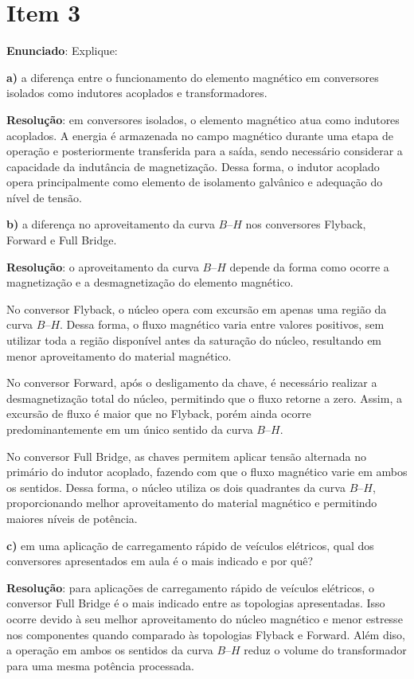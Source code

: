 \section*{Item 3}\label{it:3}

\textbf{Enunciado}: Explique:

\medskip
\textbf{a)} a diferença entre o funcionamento do elemento magnético em conversores isolados como indutores acoplados e transformadores.

\medskip
\textbf{Resolução}: em conversores isolados, o elemento magnético atua como indutores acoplados. A energia é armazenada no campo magnético durante uma etapa de operação e posteriormente transferida para a saída, sendo necessário considerar a capacidade da indutância de magnetização. Dessa forma, o indutor acoplado opera principalmente como elemento de isolamento galvânico e adequação do nível de tensão.

\medskip
\textbf{b)} a diferença no aproveitamento da curva $B$--$H$ nos conversores Flyback, Forward e Full Bridge.

\medskip
\textbf{Resolução}: o aproveitamento da curva $B$--$H$ depende da forma como ocorre a magnetização e a desmagnetização do elemento magnético.

No conversor Flyback, o núcleo opera com excursão em apenas uma região da curva $B$--$H$. Dessa forma, o fluxo magnético varia entre valores positivos, sem utilizar toda a região disponível antes da saturação do núcleo, resultando em menor aproveitamento do material magnético.

No conversor Forward, após o desligamento da chave, é necessário realizar a desmagnetização total do núcleo, permitindo que o fluxo retorne a zero. Assim, a excursão de fluxo é maior que no Flyback, porém ainda ocorre predominantemente em um único sentido da curva $B$--$H$.

No conversor Full Bridge, as chaves permitem aplicar tensão alternada no primário do indutor acoplado, fazendo com que o fluxo magnético varie em ambos os sentidos. Dessa forma, o núcleo utiliza os dois quadrantes da curva $B$--$H$, proporcionando melhor aproveitamento do material magnético e permitindo maiores níveis de potência.

\medskip
\textbf{c)} em uma aplicação de carregamento rápido de veículos elétricos, qual dos conversores apresentados em aula é o mais indicado e por quê?

\medskip
\textbf{Resolução}: para aplicações de carregamento rápido de veículos elétricos, o conversor Full Bridge é o mais indicado entre as topologias apresentadas. Isso ocorre devido à seu melhor aproveitamento do núcleo magnético e menor estresse nos componentes quando comparado às topologias Flyback e Forward. Além diso, a operação em ambos os sentidos da curva $B$--$H$ reduz o volume do transformador para uma mesma potência processada.